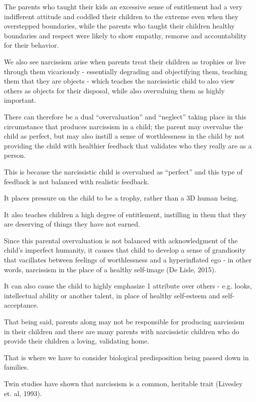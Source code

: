 \documentclass[oneside]{book}
\numberwithin{equation}{section}
\begin{document}
The parents who taught their kids an excessive sense of entitlement had a very indifferent attitude and coddled their children to the extreme even when they overstepped boundaries, while the parents who taught their children healthy boundaries and respect were likely to show empathy, remorse and accountability for their behavior.

%
We also see narcissism arise when parents treat their children as trophies or live through them vicariously - essentially degrading and objectifying them, teaching them that they are objects - which teaches the narcissistic child to also view others as objects for their disposal, while also overvaluing them as highly important.

There can therefore be a dual ``overvaluation'' and ``neglect'' taking place in this circumstance that produces narcissism in a child; the parent may overvalue the child as perfect, but may also instill a sense of worthlessness in the child by not providing the child with healthier feedback that validates who they really are as a person.

This is because the narcissistic child is overvalued as ``perfect'' and this type of feedback is not balanced with realistic feedback.

It places pressure on the child to be a trophy, rather than a 3D human being.

It also teaches children a high degree of entitlement, instilling in them that they are deserving of things they have not earned.

%
Since this parental overvaluation is not balanced with acknowledgment of the child's imperfect humanity, it causes that child to develop a sense of grandiosity that vacillates between feelings of worthlessness and a hyperinflated ego - in other words, narcissism in the place of a healthy self-image (De Lisle, 2015).

It can also cause the child to highly emphasize 1 attribute over others - e.g. looks, intellectual ability or another talent, in place of healthy self-esteem and self-acceptance.

%
That being said, parents along may not be responsible for producing narcissism in their children and there are many parents with narcissistic children who do provide their children a loving, validating home.

That is where we have to consider biological predisposition being passed down in families.

Twin studies have shown that narcissism is a common, heritable trait (Livesley et. al, 1993).
\end{document}
